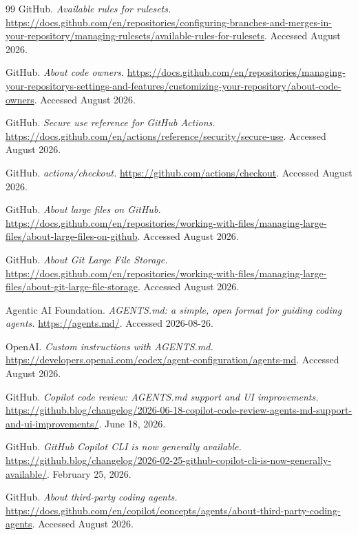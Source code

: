\documentclass[11pt]{article}
\begin{document}
\begin{thebibliography}{99}
GitHub. \textit{Available rules for rulesets.}
\url{https://docs.github.com/en/repositories/configuring-branches-and-merges-in-your-repository/managing-rulesets/available-rules-for-rulesets}.
Accessed August 2026.

GitHub. \textit{About code owners.}
\url{https://docs.github.com/en/repositories/managing-your-repositorys-settings-and-features/customizing-your-repository/about-code-owners}.
Accessed August 2026.

GitHub. \textit{Secure use reference for GitHub Actions.}
\url{https://docs.github.com/en/actions/reference/security/secure-use}. Accessed August 2026.

GitHub. \textit{actions/checkout.} \url{https://github.com/actions/checkout}.
Accessed August 2026.

GitHub. \textit{About large files on GitHub.}
\url{https://docs.github.com/en/repositories/working-with-files/managing-large-files/about-large-files-on-github}.
Accessed August 2026.

GitHub. \textit{About Git Large File Storage.}
\url{https://docs.github.com/en/repositories/working-with-files/managing-large-files/about-git-large-file-storage}.
Accessed August 2026.

Agentic AI Foundation. \textit{AGENTS.md: a simple, open format for guiding coding agents.}
\url{https://agents.md/}. Accessed 2026-08-26.

OpenAI. \textit{Custom instructions with AGENTS.md.}
\url{https://developers.openai.com/codex/agent-configuration/agents-md}. Accessed August 2026.

GitHub. \textit{Copilot code review: AGENTS.md support and UI improvements.}
\url{https://github.blog/changelog/2026-06-18-copilot-code-review-agents-md-support-and-ui-improvements/}.
June 18, 2026.

GitHub. \textit{GitHub Copilot CLI is now generally available.}
\url{https://github.blog/changelog/2026-02-25-github-copilot-cli-is-now-generally-available/}.
February 25, 2026.

GitHub. \textit{About third-party coding agents.}
\url{https://docs.github.com/en/copilot/concepts/agents/about-third-party-coding-agents}.
Accessed August 2026.


\end{thebibliography}
\end{document}
